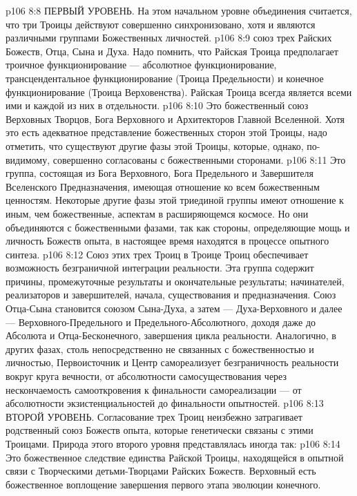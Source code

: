 \vs p106 8:8 \pc ПЕРВЫЙ УРОВЕНЬ. На этом начальном уровне объединения считается, что три Троицы действуют совершенно синхронизовано, хотя и являются различными группами Божественных личностей.
\vs p106 8:9 \bibnobreakspace {} союз трех Райских Божеств, Отца, Сына и Духа. Надо помнить, что Райская Троица предполагает троичное функционирование --- абсолютное функционирование, трансцендентальное функционирование (Троица Предельности) и конечное функционирование (Троица Верховенства). Райская Троица всегда является всеми ими и каждой из них в отдельности.
\vs p106 8:10 \bibnobreakspace {} Это божественный союз Верховных Творцов, Бога Верховного и Архитекторов Главной Вселенной. Хотя это есть адекватное представление божественных сторон этой Троицы, надо отметить, что существуют другие фазы этой Троицы, которые, однако, по\hyp{}видимому, совершенно согласованы с божественными сторонами.
\vs p106 8:11 \bibnobreakspace {} Это группа, состоящая из Бога Верховного, Бога Предельного и Завершителя Вселенского Предназначения, имеющая отношение ко всем божественным ценностям. Некоторые другие фазы этой триединой группы имеют отношение к иным, чем божественные, аспектам в расширяющемся космосе. Но они объединяются с божественными фазами, так как стороны, определяющие мощь и личность Божеств опыта, в настоящее время находятся в процессе опытного синтеза.
\vs p106 8:12 \pc Союз этих трех Троиц в Троице Троиц обеспечивает возможность безграничной интеграции реальности. Эта группа содержит причины, промежуточные результаты и окончательные результаты; начинателей, реализаторов и завершителей, начала, существования и предназначения. Союз Отца\hyp{}Сына становится союзом Сына\hyp{}Духа, а затем --- Духа\hyp{}Верховного и далее --- Верховного\hyp{}Предельного и Предельного\hyp{}Абсолютного, доходя даже до Абсолюта и Отца\hyp{}Бесконечного, завершения цикла реальности. Аналогично, в других фазах, столь непосредственно не связанных с божественностью и личностью, Первоисточник и Центр самореализует безграничность реальности вокруг круга вечности, от абсолютности самосуществования через нескончаемость самооткровения к финальности самореализации --- от абсолютности экзистенциальностей до финальности опытностей.
\vs p106 8:13 \pc ВТОРОЙ УРОВЕНЬ. Согласование трех Троиц неизбежно затрагивает родственный союз Божеств опыта, которые генетически связаны с этими Троицами. Природа этого второго уровня представлялась иногда так:
\vs p106 8:14 \bibnobreakspace {} Это божественное следствие единства Райской Троицы, находящейся в опытной связи с Творческими детьми\hyp{}Творцами Райских Божеств. Верховный есть божественное воплощение завершения первого этапа эволюции конечного.
